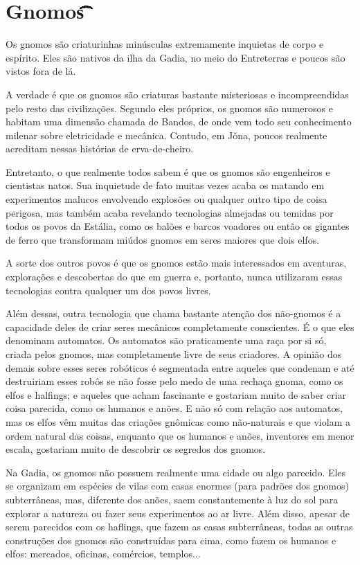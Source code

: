 \documentclass{RPG_Adventure}[2021/10/20]
\begin{document}
\section*{Gnomos\t\t\t\t\t\t\t\t\t\t\t\t\t\t}%
\label{sec:gnomos}

Os gnomos são criaturinhas minúsculas extremamente inquietas de corpo e
espírito. Eles são nativos da ilha da Gadia, no meio do Entreterras e poucos são
vistos fora de lá.

A verdade é que os gnomos são criaturas bastante misteriosas e incompreendidas
pelo resto das civilizações. Segundo eles próprios, os gnomos são numerosos e
habitam uma dimensão chamada de Bandos, de onde vem todo seu conhecimento
milenar sobre eletricidade e mecânica. Contudo, em Jǒna, poucos realmente
acreditam nessas histórias de erva-de-cheiro.

Entretanto, o que realmente todos sabem é que os gnomos são engenheiros e
cientistas natos. Sua inquietude de fato muitas vezes acaba os matando em
experimentos malucos envolvendo explosões ou qualquer outro tipo de coisa
perigosa, mas também acaba revelando tecnologias almejadas ou temidas por todos
os povos da Estália, como os balões e barcos voadores ou então os gigantes de
ferro que transformam miúdos gnomos em seres maiores que dois elfos.

A sorte dos outros povos é que os gnomos estão mais interessados em aventuras,
explorações e descobertas do que em guerra e, portanto, nunca utilizaram essas
tecnologias contra qualquer um dos povos livres.

Além dessas, outra tecnologia que chama bastante atenção dos não-gnomos é a
capacidade deles de criar seres mecânicos completamente conscientes. É o que
eles denominam automatos. Os automatos são praticamente uma raça por si só,
criada pelos gnomos, mas completamente livre de seus criadores. A opinião dos
demais sobre esses seres robóticos é segmentada entre aqueles que condenam e até
destruiriam esses robôs se não fosse pelo medo de uma rechaça gnoma, como os
elfos e halfings; e aqueles que acham fascinante e gostariam muito de saber
criar coisa parecida, como os humanos e anões. E não só com relação aos
automatos, mas os elfos vêm muitas das criações gnômicas como não-naturais e que
violam a ordem natural das coisas, enquanto que os humanos e anões, inventores
em menor escala, gostariam muito de descobrir os segredos dos gnomos.

Na Gadia, os gnomos não possuem realmente uma cidade ou algo parecido. Eles se
organizam em espécies de vilas com casas enormes (para padrões dos gnomos)
subterrâneas, mas, diferente dos anões, saem constantemente à luz do sol para
explorar a natureza ou fazer seus experimentos ao ar livre. Além disso, apesar
de serem parecidos com os haflings, que fazem as casas subterrâneas, todas as
outras construções dos gnomos são construídas para cima, como fazem os humanos e
elfos: mercados, oficinas, comércios, templos...
\end{document}
